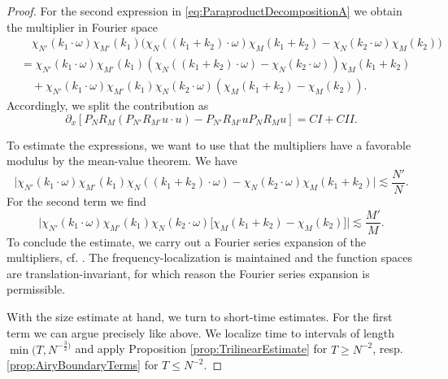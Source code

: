 \documentclass{amsart}
\theoremstyle{definition}
\begin{document}
\begin{proof}
\smallskip

For the second expression in \eqref{eq:ParaproductDecompositionA} we obtain the multiplier in Fourier space
\begin{equation*}
\begin{split}
&\quad \chi_{N'}(k_{1} \cdot \omega) \chi_{M'}(k_1) \big( \chi_N((k_1 + k_2) \cdot \omega ) \chi_M(k_1+k_2) - \chi_N( k_2 \cdot \omega) \chi_M(k_2) \big) \\
&= \chi_{N'}(k_1 \cdot \omega) \chi_{M'}(k_1) (\chi_N(( k_1 + k_2 ) \cdot \omega) - \chi_N(k_2 \cdot \omega)) \chi_M(k_1 + k_2) \\
&\quad + \chi_{N'}(k_1 \cdot \omega) \chi_{M'}(k_1) \chi_N(k_2 \cdot \omega) ( \chi_M(k_1+k_2) - \chi_M(k_2) ) .
\end{split}
\end{equation*}
Accordingly, we split the contribution as
\begin{equation*}
\partial_x [ P_N R_M ( P_{N'} R_{M'} u \cdot u) - P_{N'} R_{M'} u P_N R_M u ] = CI + CII.
\end{equation*}

To estimate the expressions, we want to use that the multipliers have a favorable modulus by the mean-value theorem. We have
\begin{equation}
\label{eq:CommI}
\big| \chi_{N'}(k_1 \cdot \omega) \chi_{M'}(k_1) \chi_N( ( k_1 + k_2 ) \cdot \omega) - \chi_N(k_2 \cdot \omega) \chi_M(k_1+k_2) \big| \lesssim \frac{N'}{N}.
\end{equation}
For the second term we find
\begin{equation}
\label{eq:CommII}
\big| \chi_{N'}(k_1 \cdot \omega) \chi_{M'}(k_1) \chi_N(k_2 \cdot \omega) \big[ \chi_M(k_1+k_2) - \chi_M(k_2) \big] \big| \lesssim \frac{M'}{M}.
\end{equation}
To conclude the estimate, we carry out a Fourier series expansion of the multipliers, cf. \cite[Remark~5.9]{KimSchippa2021}. The frequency-localization is maintained and the function spaces are translation-invariant, for which reason the Fourier series expansion is permissible.

With the size estimate at hand, we turn to short-time estimates. For the first term we can argue precisely like above. We localize time to intervals of length $\min(T, N^{-\frac{3}{2})}$ and apply Proposition \ref{prop:TrilinearEstimate} for $T \geq N^{-2}$, resp. \ref{prop:AiryBoundaryTerms} for $T \leq N^{-2}$.


\end{proof}
\end{document}
